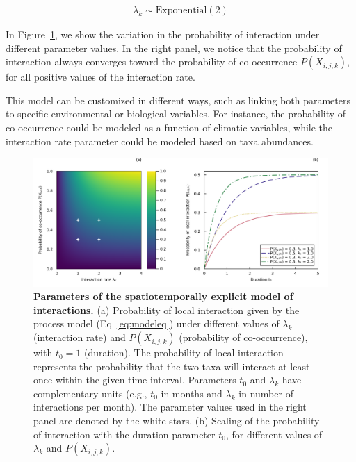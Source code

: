 \begin{box2.1}
\begin{eqnarray}
  \label{eq:modellambda}
  \lambda_k \sim \text{Exponential}(2)
\end{eqnarray}

In Figure~\ref{fig:spatiotemporal}, we show the variation in the probability of
interaction under different parameter values. In the right panel, we notice
that the probability of interaction always converges toward the probability of
co-occurrence $P(X_{i,j,k})$, for all positive values of the interaction rate. 

This model can be customized in different ways, such as linking both
parameters to specific environmental or biological variables. For instance,
the probability of co-occurrence could be modeled as a function of climatic
variables, while the interaction rate parameter could be modeled based on taxa
abundances.

\end{box2.1}

\begin{figure}[!h]
  \centering
  \includegraphics[width=\textwidth]{figures/article1/spatiotemporal_model.png}
  \caption{\textbf{Parameters of the spatiotemporally explicit model of interactions.}
  (a) Probability of local interaction given by the process model (Eq~\ref{eq:modeleq})
  under different values of $\lambda_k$ (interaction rate) and $P(X_{i,j,k})$
  (probability of co-occurrence), with $t_0 = 1$ (duration). The probability of
  local interaction represents the probability that the two taxa will interact
  at least once within the given time interval. Parameters $t_0$ and $\lambda_k$
  have complementary units (e.g., $t_0$ in months and $\lambda_k$ in number of
  interactions per month). The parameter values used in the right panel are
  denoted by the white stars. (b) Scaling of the probability of interaction with
  the duration parameter $t_0$, for different values of $\lambda_k$ and
  $P(X_{i,j,k})$.}
  \label{fig:spatiotemporal}
\end{figure}

